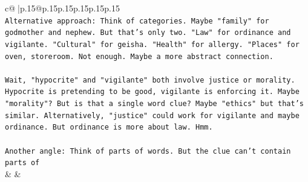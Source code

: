 \documentclass{article}
\begin{document}
{\begin{supertabular}{c@{$\;$}|p{.15\linewidth}@{}p{.15\linewidth}p{.15\linewidth}p{.15\linewidth}p{.15\linewidth}p{.15\linewidth}}
{{{\\ 
\texttt{Alternative approach: Think of categories. Maybe "family" for godmother and nephew. But that's only two. "Law" for ordinance and vigilante. "Cultural" for geisha. "Health" for allergy. "Places" for oven, storeroom. Not enough. Maybe a more abstract connection.} \\
\\ 
\texttt{Wait, "hypocrite" and "vigilante" both involve justice or morality. Hypocrite is pretending to be good, vigilante is enforcing it. Maybe "morality"? But is that a single word clue? Maybe "ethics" but that's similar. Alternatively, "justice" could work for vigilante and maybe ordinance. But ordinance is more about law. Hmm.} \\
\\ 
\texttt{Another angle: Think of parts of words. But the clue can't contain parts of} \\
            }
        }
    }
    & & \\ \\


\end{supertabular}}
\end{document}
